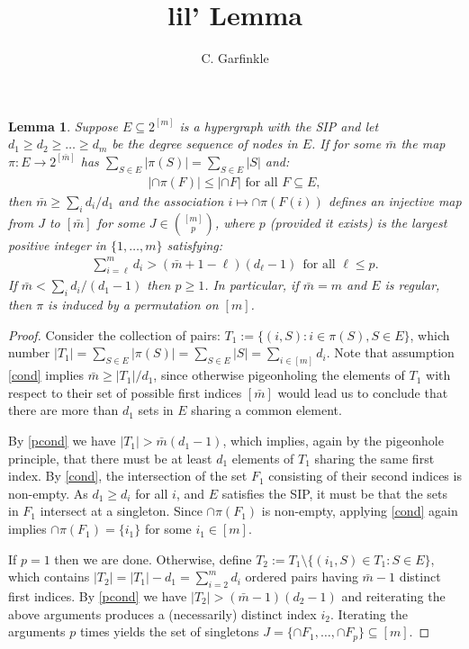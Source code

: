 \documentclass[journal, onecolumn]{IEEEtran}
\newtheorem{lemma}{Lemma}
\begin{document}
\title{lil' Lemma}

\author{C. Garfinkle}

\maketitle

\begin{lemma}
Suppose $E \subseteq 2^{[m]}$ is a hypergraph with the SIP and let $d_1 \geq d_2 \geq \ldots \geq d_m$ be the degree sequence of nodes in $E$. If for some $\bar m$ the map $\pi: E \to 2^{[\bar m]}$ has $\sum_{S \in E} |\pi(S)| = \sum_{S \in E} |S|$ and:
\begin{align}\label{cond}
|\cap \pi(F)| \leq |\cap F | \text{ for all } F \subseteq E,
\end{align}
then $\bar m \geq\sum_i d_i / d_1$ and the association $i \mapsto \cap \pi(F(i))$ defines an injective map from $J$ to $[\bar m]$ for some $J \in {[m] \choose p}$, where $p$ (provided it exists) is the largest positive integer in $\{1, \ldots, m\}$ satisfying:
\begin{align}\label{pcond}
\sum_{i=\ell}^{m} d_{i} > (\bar m + 1 - \ell) (d_\ell - 1) \ \ \text{for all } \ell \leq p.
\end{align}
If $\bar m < \sum_i d_i / (d_1 - 1)$ then $p \geq 1$. 
In particular, if $\bar m = m$ and $E$ is regular, then $\pi$ is induced by a permutation on $[m]$. 
\end{lemma}

\begin{proof}
Consider the collection of pairs: $T_1 := \{(i, S): i \in \pi(S), S \in E\}$, which number $|T_1| = \sum_{S \in E} |\pi(S)| = \sum_{S \in E} |S| = \sum_{i \in [m]} d_i$. Note that assumption \eqref{cond} implies $\bar m \geq |T_1| / d_1$, since otherwise pigeonholing the elements of $T_1$ with respect to their set of possible first indices $[\bar m]$ would lead us to conclude that there are more than $d_1$ sets in $E$ sharing a common element. %

By \eqref{pcond} we have $|T_1| >  \bar m (d_1 - 1)$, which implies, again by the pigeonhole principle, that there must be at least $d_1$ elements of $T_1$ sharing the same first index. By \eqref{cond}, the intersection of the set $F_1$ consisting of their second indices is non-empty. As $d_1 \geq d_i$ for all $i$, and $E$ satisfies the SIP, it must be that the sets in $F_1$ intersect at a singleton. Since $\cap \pi(F_1)$ is non-empty, applying \eqref{cond} again implies $\cap \pi(F_1) = \{i_1\}$ for some $i_1 \in [m]$. 

If $p=1$ then we are done. Otherwise, define $T_2 := T_1 \setminus \{(i_1,S) \in T_1: S \in E\}$, which contains $|T_2| = |T_1| - d_1 = \sum_{i=2}^m d_i$ ordered pairs having $\bar m - 1$ distinct first indices. By \eqref{pcond} we have $|T_2| > (\bar m - 1)(d_2 - 1)$ and reiterating the above arguments produces a (necessarily) distinct index $i_2$. Iterating the arguments $p$ times yields the set of singletons \mbox{$J = \{\cap F_1, \ldots, \cap F_p\} \subseteq [m]$}.
\end{proof}
\end{document}
